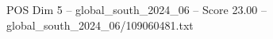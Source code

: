 \begin{textsample}{POS Dim 5 – global\_south\_2024\_06 – Score 23.00 – global\_south\_2024\_06/109060481.txt}
\end{textsample}
